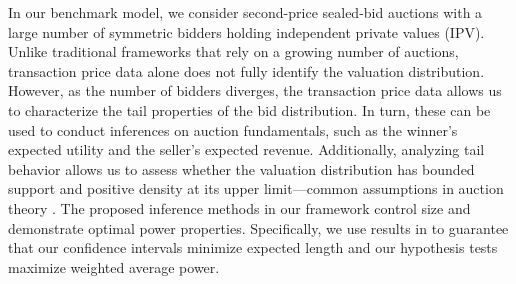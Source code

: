
In our benchmark model, we consider second-price sealed-bid auctions with a large number of symmetric bidders holding independent private values (IPV). 
Unlike traditional frameworks that rely on a growing number of auctions, transaction price data alone does not fully identify the valuation distribution. However, as the number of bidders diverges, the transaction price data allows us to characterize the tail properties of the bid distribution. In turn, these can be used to conduct inferences on auction fundamentals, such as the winner's expected utility and the seller's expected revenue. Additionally, analyzing tail behavior allows us to assess whether the valuation distribution has bounded support and positive density at its upper limit—common assumptions in auction theory \citep[e.g.,][]{MaskinRiley1984,guerre2000,GuerreLuo2022}. The proposed inference methods in our framework control size and demonstrate optimal power properties. Specifically, we use results in \cite{elliott2015} to guarantee that our confidence intervals minimize expected length and our hypothesis tests maximize weighted average power. 

